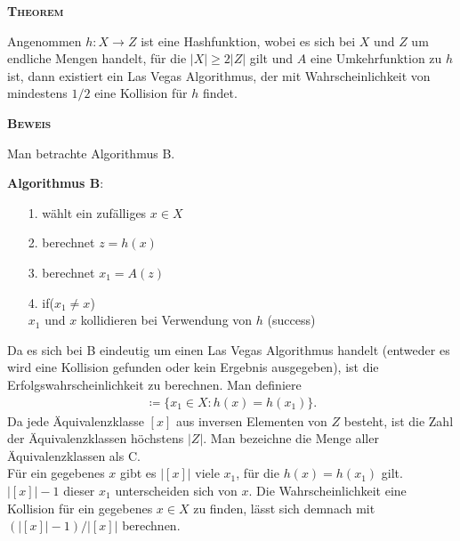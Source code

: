 \documentclass[12pt,a4paper]{scrartcl}
\numberwithin{equation}{section}
\numberwithin{myalgctr}{section}
\newcounter{mytheoremctr}
\newenvironment{mytheorem}{%
	\bigskip\noindent%
	\refstepcounter{mytheoremctr}%
	\textsc{\textbf{Theorem} \themytheoremctr}%
	\newline
}{\par\bigskip}  %
\numberwithin{mytheoremctr}{section}
\newenvironment{myproof}{%
	\bigskip\noindent%
	\textsc{\textbf{Beweis}}%
	\indent
}{\par\bigskip}  %
\begin{document}
\begin{mytheorem}
	Angenommen $h: X\rightarrow Z$ ist eine Hashfunktion, wobei es sich bei $X$ und $Z$ um endliche Mengen handelt, für die $|X| \geq 2|Z|$ gilt und $A$ eine Umkehrfunktion zu $h$ ist, dann existiert ein Las Vegas Algorithmus, der mit Wahrscheinlichkeit von mindestens $1/2$ eine Kollision für $h$ findet.
	\autocite[vgl.][S. 234]{cryptography}
\end{mytheorem}

\begin{myproof}
	Man betrachte Algorithmus B. \autocite[vgl.][S. 234 f.]{cryptography}
	\begin{framed}%
			\textbf{Algorithmus B}: 
			\begin{itemize}
				\item[1.]
					wählt ein zufälliges $x \in X$
				\item[2.]
					berechnet $z = h(x)$
				\item[3.]
					berechnet $x_1 = A(z)$
				\item[4.] 
				if($x_1\neq x$)\\
				\hspace*{1cm}$x_1$ und $x$ kollidieren bei Verwendung von $h$ (success)\\
			\end{itemize}
	\end{framed}
	\par
\vspace{.25cm}
			\noindent
		Da es sich bei B eindeutig um einen Las Vegas Algorithmus handelt (entweder es wird eine Kollision gefunden oder kein Ergebnis ausgegeben), ist die Erfolgswahrscheinlichkeit zu berechnen. Man definiere
	\begin{align}
	[x] \coloneqq \{x_1 \in X : h(x) = h(x_1)\}.
	\end{align}
	Da jede Äquivalenzklasse $[x]$ aus inversen Elementen von $Z$ besteht, ist die Zahl der Äquivalenzklassen höchstens $|Z|$. Man bezeichne die Menge aller Äquivalenzklassen als C. \\
	Für ein gegebenes $x$ gibt es $|[x]|$ viele $x_1$, für die $h(x) = h(x_1)$ gilt. $|[x]| -1$ dieser $x_1$ unterscheiden sich von $x$.
	Die Wahrscheinlichkeit eine Kollision für ein gegebenes $x \in X$ zu finden, lässt sich demnach mit $(|[x]|-1)/|[x]|$ berechnen.\\

\end{myproof}
\end{document}
